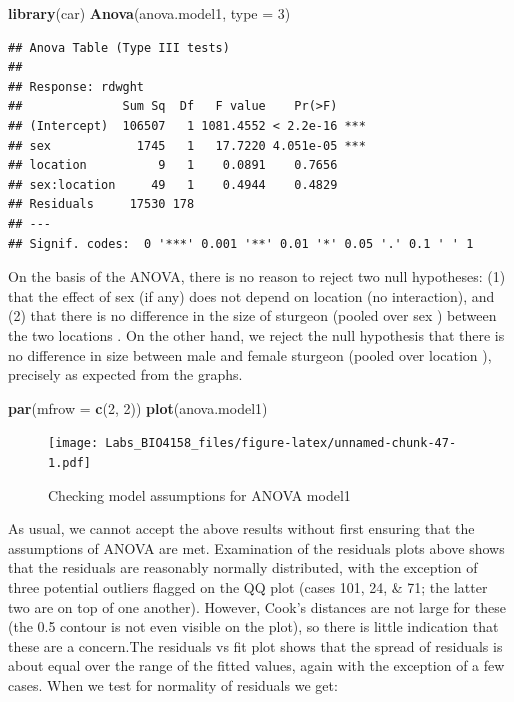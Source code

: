 \documentclass[
  12pt,
]{book}
\newenvironment{Shaded}{\begin{snugshade}}{\end{snugshade}}
\newcommand{\DataTypeTok}[1]{\textcolor[rgb]{0.13,0.29,0.53}{#1}}
\newcommand{\DecValTok}[1]{\textcolor[rgb]{0.00,0.00,0.81}{#1}}
\newcommand{\KeywordTok}[1]{\textcolor[rgb]{0.13,0.29,0.53}{\textbf{#1}}}
\newcommand{\NormalTok}[1]{#1}
\begin{document}
\begin{Shaded}
\begin{Highlighting}[]
\KeywordTok{library}\NormalTok{(car)}
\KeywordTok{Anova}\NormalTok{(anova.model1, }\DataTypeTok{type =} \DecValTok{3}\NormalTok{)}
\end{Highlighting}
\end{Shaded}

\begin{verbatim}
## Anova Table (Type III tests)
## 
## Response: rdwght
##              Sum Sq  Df   F value    Pr(>F)    
## (Intercept)  106507   1 1081.4552 < 2.2e-16 ***
## sex            1745   1   17.7220 4.051e-05 ***
## location          9   1    0.0891    0.7656    
## sex:location     49   1    0.4944    0.4829    
## Residuals     17530 178                        
## ---
## Signif. codes:  0 '***' 0.001 '**' 0.01 '*' 0.05 '.' 0.1 ' ' 1
\end{verbatim}

On the basis of the ANOVA, there is no reason to reject two null hypotheses: (1) that the effect of sex (if any) does not depend on location (no interaction), and (2) that there is no difference in the size of sturgeon (pooled over sex ) between the two locations . On the other hand, we reject the null hypothesis that there is no difference in size between male and female sturgeon (pooled over location ), precisely as expected from the graphs.

\begin{Shaded}
\begin{Highlighting}[]
\KeywordTok{par}\NormalTok{(}\DataTypeTok{mfrow =} \KeywordTok{c}\NormalTok{(}\DecValTok{2}\NormalTok{, }\DecValTok{2}\NormalTok{))}
\KeywordTok{plot}\NormalTok{(anova.model1)}
\end{Highlighting}
\end{Shaded}

\begin{figure}
\centering
\texttt{[image: Labs\_BIO4158\_files/figure-latex/unnamed-chunk-47-1.pdf]}
\caption{\label{fig:unnamed-chunk-47}Checking model assumptions for ANOVA model1}
\end{figure}

As usual, we cannot accept the above results without first ensuring that the assumptions of ANOVA are met. Examination of the residuals plots above shows that the residuals are reasonably normally distributed, with the exception of three potential outliers flagged on the QQ plot (cases 101, 24, \& 71; the latter two are on top of one another). However, Cook's distances are not large for these (the 0.5 contour is not even visible on the plot), so there is little indication that these are a concern.The residuals vs fit plot shows that the spread of residuals is about equal over the range of the fitted values, again with the exception of a few cases. When we test for normality of residuals we get:
\end{document}
